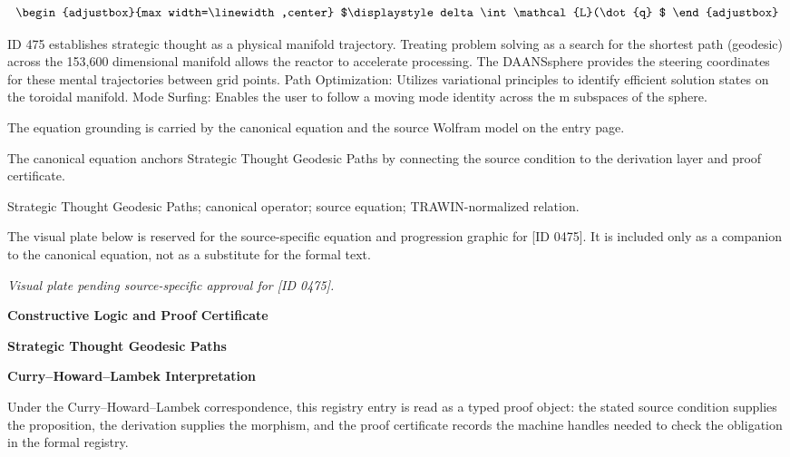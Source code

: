 \[
\begin{adjustbox}{max width=\linewidth,center}
$\displaystyle
delta \int \mathcal{L}(\dot{q}
$
\end{adjustbox}
\]

ID 475 establishes strategic thought as a physical manifold trajectory. Treating problem solving as a search for the shortest path (geodesic) across the 153,600 dimensional manifold allows the reactor to accelerate processing. The DAANSsphere provides the steering coordinates for these mental trajectories between grid points. Path Optimization: Utilizes variational principles to identify efficient solution states on the toroidal manifold. Mode Surfing: Enables the user to follow a moving mode identity across the m subspaces of the sphere.

The equation grounding is carried by the canonical equation and the source Wolfram model on the entry page.

The canonical equation anchors Strategic Thought Geodesic Paths by connecting the source condition to the derivation layer and proof certificate.

Strategic Thought Geodesic Paths; canonical operator; source equation; TRAWIN-normalized relation.
\endgroup

\begingroup\footnotesize\sloppy
The visual plate below is reserved for the source-specific equation and progression graphic for [ID 0475]. It is included only as a companion to the canonical equation, not as a substitute for the formal text.
\par\endgroup
\begingroup\footnotesize\itshape
Visual plate pending source-specific approval for [ID 0475].
\par\endgroup

\clearpage
\begingroup\tzpsupportsetup
\noindent\textbf{\fontsize{10.8pt}{12.8pt}\selectfont [ID 0475] Constructive Logic and Proof Certificate}\par
\noindent\textbf{\fontsize{10pt}{12pt}\selectfont Strategic Thought Geodesic Paths}\par
\vspace{0.45em}
\begingroup
\footnotesize
\setlength{\parskip}{0.22em}
\setlength{\parindent}{0pt}
\noindent\textbf{Curry--Howard--Lambek Interpretation}\par
Under the Curry--Howard--Lambek correspondence, this registry entry is read as a typed proof
object: the stated source condition supplies the proposition, the derivation supplies the
morphism, and the proof certificate records the machine handles needed to check the obligation
in the formal registry.

